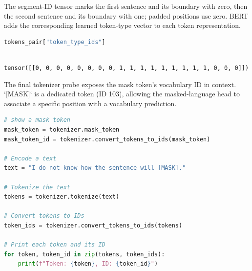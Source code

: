 \documentclass[../labs.tex]{subfiles}
\begin{document}
The segment-ID tensor marks the first sentence and its boundary with zero, then the second sentence and its boundary with one; padded positions use zero. BERT adds the corresponding learned token-type vector to each token representation.


\begin{lstlisting}[language=Python,basicstyle=\ttfamily\scriptsize,breaklines=true,breakatwhitespace=false,columns=fullflexible,keepspaces=true,numbers=none]
tokens_pair["token_type_ids"]
\end{lstlisting}

\hypertarget{out:lab03-bert-c08}{}\label{out:lab03-bert-c08}

\begin{lstlisting}[style=terminalOutput,breakatwhitespace=false,columns=fullflexible]

tensor([[0, 0, 0, 0, 0, 0, 0, 0, 1, 1, 1, 1, 1, 1, 1, 1, 1, 0, 0, 0]])

\end{lstlisting}


The final tokenizer probe exposes the mask token’s vocabulary ID in context. `[MASK]` is a dedicated token (ID 103), allowing the masked-language head to associate a specific position with a vocabulary prediction.


\begin{lstlisting}[language=Python,basicstyle=\ttfamily\scriptsize,breaklines=true,breakatwhitespace=false,columns=fullflexible,keepspaces=true,numbers=none]
# show a mask token 
mask_token = tokenizer.mask_token 
mask_token_id = tokenizer.convert_tokens_to_ids(mask_token)

# Encode a text
text = "I do not know how the sentence will [MASK]."

# Tokenize the text
tokens = tokenizer.tokenize(text)

# Convert tokens to IDs
token_ids = tokenizer.convert_tokens_to_ids(tokens)

# Print each token and its ID
for token, token_id in zip(tokens, token_ids):
    print(f"Token: {token}, ID: {token_id}")
\end{lstlisting}

\hypertarget{out:lab03-bert-c09}{}\label{out:lab03-bert-c09}
\end{document}
